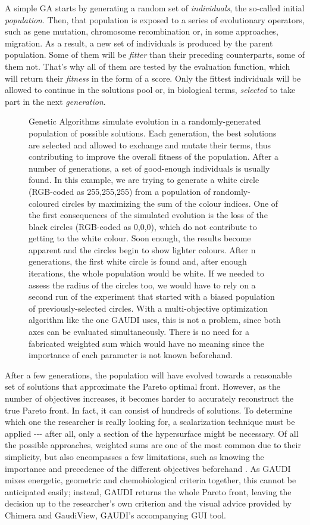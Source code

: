 A simple GA starts by generating a random set of \emph{individuals}, the so-called initial \emph{population}. Then, that population is exposed to a series of evolutionary operators, such as gene mutation, chromosome recombination or, in some approaches, migration. As a result, a new set of individuals is produced by the parent population. Some of them will be \emph{fitter} than their preceding counterparts, some of them not. That's why all of them are tested by the evaluation function, which will return their \emph{fitness} in the form of a score. Only the fittest individuals will be allowed to continue in the solutions pool or, in biological terms, \emph{selected} to take part in the next \emph{generation}.
\begin{figure}
\noindent{}
\caption{Genetic Algorithms simulate evolution in a randomly-generated population of possible solutions. Each generation, the best solutions are selected and allowed to exchange and mutate their terms, thus contributing to improve the overall fitness of the population. After a number of generations, a set of good-enough individuals is usually found. In this example, we are trying to generate a white circle (RGB-coded as 255,255,255) from a population of randomly-coloured circles by maximizing the sum of the colour indices. One of the first consequences of the simulated evolution is the loss of the black circles (RGB-coded as 0,0,0), which do not contribute to getting to the white colour. Soon enough, the results become apparent and the circles begin to show lighter colours. After n generations, the first white circle is found and, after enough iterations, the whole population would be white.
If we needed to assess the radius of the circles too, we would have to rely on a second run of the experiment that started with a biased population of previously-selected circles. With a multi-objective optimization algorithm like the one GAUDI uses, this is not a problem, since both axes can be evaluated simultaneously. There is no need for a fabricated weighted sum which would have no meaning since the importance of each parameter is not known beforehand.}
\end{figure}

After a few generations, the population will have evolved towards a reasonable set of solutions that approximate the Pareto optimal front. However, as the number of objectives increases, it becomes harder to accurately reconstruct the true Pareto front. In fact, it can consist of hundreds of solutions. To determine which one the researcher is really looking for, a scalarization technique must be applied -{}-{}- after all, only a section of the hypersurface might be necessary. Of all the possible approaches, weighted sums are one of the most common due to their simplicity, but also encompasses a few limitations, such as knowing the importance and precedence of the different objectives beforehand \citep{Hwang1979}. As GAUDI mixes energetic, geometric and chemobiological criteria together, this cannot be anticipated easily; instead, GAUDI returns the whole Pareto front, leaving the decision up to the researcher's own criterion and the visual advice provided by Chimera and GaudiView, GAUDI's accompanying GUI tool.


